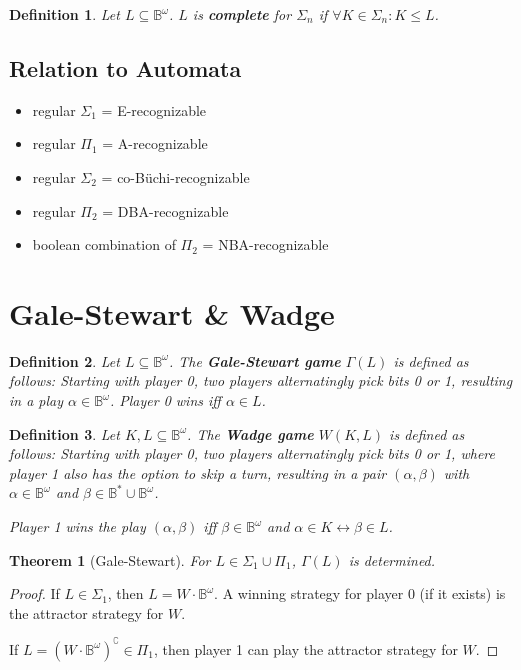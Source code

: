 \documentclass{article}
\newtheorem{theorem}{Theorem}
\newtheorem{definition}{Definition}
\begin{document}
\begin{definition}
	Let $L \subseteq \mathbb{B}^\omega$. $L$ is \textbf{complete} for $\Sigma_n$ if $\forall K \in \Sigma_n: K \leq L$. 
\end{definition}


\subsection{Relation to Automata}
\begin{itemize}
	\item regular $\Sigma_1$ = E-recognizable
	\item regular $\Pi_1$ = A-recognizable
	\item regular $\Sigma_2$ = co-Büchi-recognizable
	\item regular $\Pi_2$ = DBA-recognizable
	\item boolean combination of $\Pi_2$ = NBA-recognizable
\end{itemize}


\section{Gale-Stewart \& Wadge}
\begin{definition}
	Let $L \subseteq \mathbb{B}^\omega$. The \textbf{Gale-Stewart game} $\Gamma(L)$ is defined as follows: Starting with player 0, two players alternatingly pick bits 0 or 1, resulting in a play $\alpha \in \mathbb{B}^\omega$. Player 0 wins iff $\alpha \in L$.
\end{definition}

\begin{definition}
	Let $K, L \subseteq \mathbb{B}^\omega$. The \textbf{Wadge game} $W(K, L)$ is defined as follows: Starting with player 0, two players alternatingly pick bits 0 or 1, where player 1 also has the option to skip a turn, resulting in a pair $(\alpha, \beta)$ with $\alpha \in \mathbb{B}^\omega$ and $\beta \in \mathbb{B}^* \cup \mathbb{B}^\omega$.
	
	Player 1 wins the play $(\alpha, \beta)$ iff $\beta \in \mathbb{B}^\omega$ and $\alpha \in K \leftrightarrow \beta \in L$.  
\end{definition}

\begin{theorem}[Gale-Stewart]
	For $L \in \Sigma_1 \cup \Pi_1$, $\Gamma(L)$ is determined.
\end{theorem}
\begin{proof}
	If $L \in \Sigma_1$, then $L = W \cdot \mathbb{B}^\omega$. A winning strategy for player 0 (if it exists) is the attractor strategy for $W$.
	
	If $L = (W \cdot \mathbb{B}^\omega)^\complement \in \Pi_1$, then player 1 can play the attractor strategy for $W$.
\end{proof}
\end{document}
